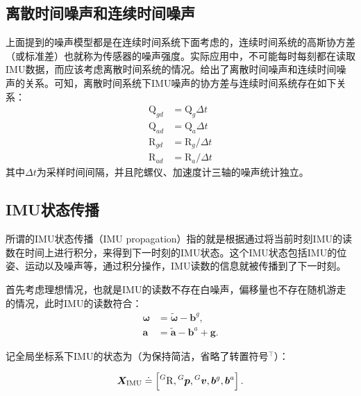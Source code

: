 \subsection{离散时间噪声和连续时间噪声}

上面提到的噪声模型都是在连续时间系统下面考虑的，连续时间系统的高斯协方差（或标准差）也就称为传感器的噪声强度。实际应用中，不可能每时每刻都在读取IMU数据，而应该考虑离散时间系统的情况。\citep{smith1978exact}给出了离散时间噪声和连续时间噪声的关系。可知，离散时间系统下IMU噪声的协方差与连续时间系统存在如下关系：
\begin{equation}
\begin{aligned}
    \mathrm{Q}_{gd} &= \mathrm{Q}_g \Delta t   \\
    \mathrm{Q}_{ad} &= \mathrm{Q}_a \Delta t   \\
    \mathrm{R}_{gd} &= \mathrm{R}_g / \Delta t \\
    \mathrm{R}_{ad} &= \mathrm{R}_a / \Delta t
\end{aligned}
\end{equation}
其中$\Delta t$为采样时间间隔，并且陀螺仪、加速度计三轴的噪声统计独立。

\subsection{IMU状态传播}

所谓的IMU状态传播（IMU propagation）指的就是根据通过将当前时刻IMU的读数在时间上进行积分，来得到下一时刻的IMU状态。这个IMU状态包括IMU的位姿、运动以及噪声等，通过积分操作，IMU读数的信息就被传播到了下一时刻。

首先考虑理想情况，也就是IMU的读数不存在白噪声，偏移量也不存在随机游走的情况，此时IMU的读数符合：
\begin{equation}
\begin{aligned}
    \bm{\omega}  &= \tilde{\bm{\omega}} - \bm{b}^g, \\
    \bm{a} &= \tilde{\bm a} - \bm{b}^a + \bm{g}.
\end{aligned}
\end{equation}

记全局坐标系下IMU的状态为（为保持简洁，省略了转置符号${}^\top$）：

\begin{equation}
  \bm{X}_{\textrm{IMU}} \doteq
  \left[
      \prescript{G}{}{\mathrm R},
      \prescript{G}{}{\bm p},
      \prescript{G}{}{\bm v},
      \bm{b}^g, \bm{b}^a
  \right].
\end{equation}

